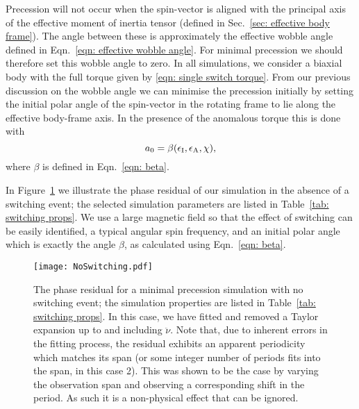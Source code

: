 \documentclass[../full_thesis/full_thesis.tex]{subfiles}
\newcommand{\thisdir}{../inertial_frame}
\begin{document}
Precession will not occur when the spin-vector is aligned with the principal
axis of the effective moment of inertia tensor (defined in Sec.~\ref{sec:
effective body frame}). The angle between these is approximately the
effective wobble angle defined in Eqn.~\eqref{eqn: effective wobble angle}.
For minimal precession we should therefore set this wobble angle to
zero. In all simulations, we consider a biaxial body with the full torque given
by \eqref{eqn: single switch torque}. From our previous discussion on the
wobble angle we can minimise the precession initially by setting the initial polar angle
of the spin-vector in the rotating frame to lie along the effective body-frame
axis. In the presence of the anomalous torque this is done with
\begin{equation}
a_{0} = \beta(\epsilon_{\mathrm{I}}, \epsilon_{\mathrm{A}}, \chi),
\end{equation}
where $\beta$ is defined in Eqn.~\eqref{eqn: beta}.

In Figure~\ref{fig: no switching} we illustrate the phase residual of our
simulation in the absence of a switching event; the selected simulation
parameters are listed in Table~\ref{tab: switching props}. We use a large
magnetic field so that the effect of switching can be easily identified, a
typical angular spin frequency, and an initial polar angle which is exactly the
angle $\beta$, as calculated using Eqn.~\eqref{eqn: beta}.

\begin{figure}[htb]
\texttt{[image: NoSwitching.pdf]}
\caption{The phase residual for a minimal precession simulation with no
         switching event; the simulation properties are listed in
         Table~\ref{tab: switching props}. In this case, we have fitted and
         removed a Taylor expansion up to and including $\ddot{\nu}$.
         Note that, due to inherent errors in the fitting process, the residual
         exhibits an apparent periodicity which matches its span (or some integer
         number of periods fits into the span, in this case 2). This was shown
         to be the case by varying the observation span and observing a
         corresponding shift in the period. As such it is a non-physical effect
         that can be ignored.
}
\label{fig: no switching}
\end{figure}

\begin{table}[htb]
\centering

\caption{Simulation properties used for Figure~\ref{fig: no switching},
Figure~\ref{fig: switching without anom}, and Figure~\ref{fig: switching with anom}.}
\label{tab: switching props}
\end{table}
\end{document}
